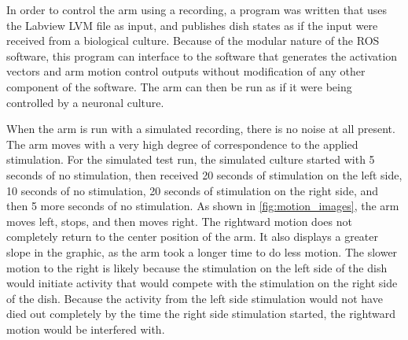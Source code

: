 \documentclass[letterpaper]{article}
\begin{document}
In order to control the arm using a recording, a program was written that uses the Labview LVM file as input, and publishes dish states as if the input were received from a biological culture.
Because of the modular nature of the ROS software, this program can interface to the software that generates the activation vectors and arm motion control outputs without modification of any other component of the software. 
The arm can then be run as if it were being controlled by a neuronal culture. 

When the arm is run with a simulated recording, there is no noise at all present. 
The arm moves with a very high degree of correspondence to the applied stimulation. 
For the simulated test run, the simulated culture started with 5 seconds of no stimulation, then received 20 seconds of stimulation on the left side, 10 seconds of no stimulation, 20 seconds of stimulation on the right side, and then 5 more seconds of no stimulation. 
As shown in \ref{fig:motion_images}, the arm moves left, stops, and then moves right. 
The rightward motion does not completely return to the center position of the arm. 
It also displays a greater slope in the graphic, as the arm took a longer time to do less motion.
The slower motion to the right is likely because the stimulation on the left side of the dish would initiate activity that would compete with the stimulation on the right side of the dish.
Because the activity from the left side stimulation would not have died out completely by the time the right side stimulation started, the rightward motion would be interfered with. 


\end{document}

